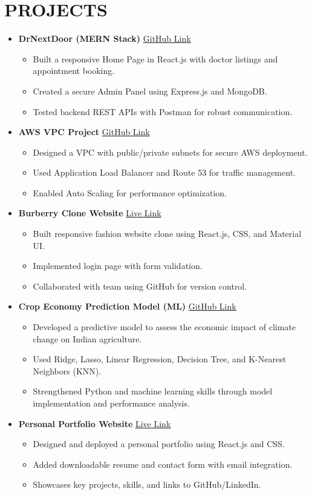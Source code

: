 \documentclass[a4paper,10pt]{article}
\newcommand{\resheading}[1]{\vspace{-5pt}\section*{\uppercase{#1}}\vspace{-6pt}}
\newcommand{\resitem}[1]{\item #1 \vspace{-4pt}}
\begin{document}
\resheading{Projects}
\begin{itemize}[leftmargin=0.15in, itemsep=8pt, topsep=1pt]

  \item \textbf{DrNextDoor (MERN Stack)} \hfill \href{https://github.com/swapnilshikha/DrNextDoor}{GitHub Link}
  \begin{itemize}[itemsep=2pt, topsep=1pt]
    \resitem{Built a responsive Home Page in React.js with doctor listings and appointment booking.}
    \resitem{Created a secure Admin Panel using Express.js and MongoDB.}
    \resitem{Tested backend REST APIs with Postman for robust communication.}
  \end{itemize}

  \item \textbf{AWS VPC Project} \hfill \href{https://github.com/swapnilshikha/AWS-Project}{GitHub Link}
  \begin{itemize}[itemsep=2pt, topsep=1pt]
    \resitem{Designed a VPC with public/private subnets for secure AWS deployment.}
    \resitem{Used Application Load Balancer and Route 53 for traffic management.}
    \resitem{Enabled Auto Scaling for performance optimization.}
  \end{itemize}

  \item \textbf{Burberry Clone Website} \hfill \href{https://coding-comandoes.github.io/Burberry-Clone/}{Live Link}
  \begin{itemize}[itemsep=2pt, topsep=1pt]
    \resitem{Built responsive fashion website clone using React.js, CSS, and Material UI.}
    \resitem{Implemented login page with form validation.}
    \resitem{Collaborated with team using GitHub for version control.}
  \end{itemize}

  \item \textbf{Crop Economy Prediction Model (ML)} \hfill \href{https://github.com/swapnilshikha/Climate_change_on_agriculture}{GitHub Link}
  \begin{itemize}[itemsep=2pt, topsep=1pt]
    \resitem{Developed a predictive model to assess the economic impact of climate change on Indian agriculture.}
    \resitem{Used Ridge, Lasso, Linear Regression, Decision Tree, and K-Nearest Neighbors (KNN).}
    \resitem{Strengthened Python and machine learning skills through model implementation and performance analysis.}
  \end{itemize}

  \item \textbf{Personal Portfolio Website} \hfill \href{https://swapnilshikha.xyz/}{Live Link}
  \begin{itemize}[itemsep=2pt, topsep=1pt]
    \resitem{Designed and deployed a personal portfolio using React.js and CSS.}
    \resitem{Added downloadable resume and contact form with email integration.}
    \resitem{Showcases key projects, skills, and links to GitHub/LinkedIn.}
  \end{itemize}

\end{itemize}
\end{document}
